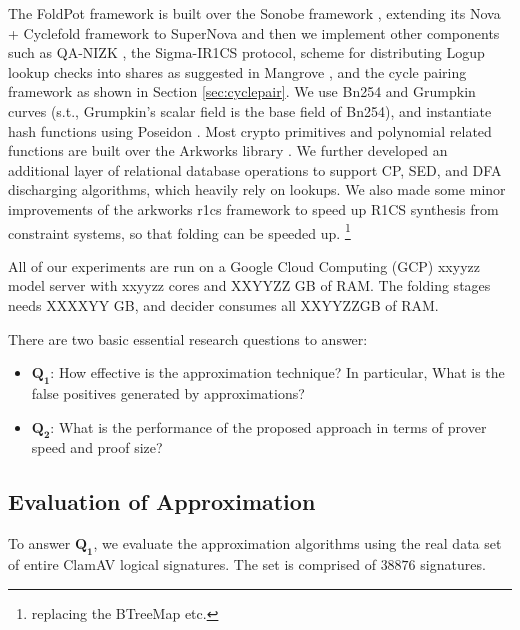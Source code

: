 The FoldPot framework is built over the
Sonobe framework \cite{Sonobe}, extending its Nova + Cyclefold framework
to SuperNova \cite{SuperNova} and then we implement other
components such as QA-NIZK \cite{Gonzalez15},
the Sigma-IR1CS protocol, scheme for distributing
Logup lookup \cite{Hab22} checks into shares as suggested
in Mangrove \cite{Mangrove}, and the 
cycle pairing framework as shown in Section \ref{sec:cyclepair}.
We use Bn254 and Grumpkin curves \cite{Grumpkin} 
(s.t., Grumpkin's scalar field is the base field of Bn254),
and instantiate hash functions using Poseidon \cite{Poseidon}.
Most crypto primitives and polynomial related functions
are built over the Arkworks library \cite{arkworks}.
We further developed an additional layer of
relational database operations to support
CP, SED, and DFA discharging algorithms,
which heavily rely on lookups.
We also made some minor improvements of the arkworks r1cs framework
to speed up R1CS synthesis from constraint systems, so that
folding can be speeded up. \footnote{replacing
the BTreeMap etc.}

 All of our experiments are run on
a Google Cloud Computing (GCP) xxyyzz model server with xxyyzz cores
and XXYYZZ GB of RAM. The folding stages needs XXXXYY GB, and
decider consumes all XXYYZZGB of RAM.

 There are two basic essential
research questions to answer: 
\begin{itemize}
	\item $\mathbf{Q_1}$: How effective is the approximation
	technique? In particular, What is the false positives generated
	by approximations? 

	\item $\mathbf{Q_2}$: What is the performance of the 
	proposed approach in terms of prover speed and proof size?
\end{itemize}

\subsection{Evaluation of Approximation}
To answer $\mathbf{Q_1}$, we evaluate the approximation algorithms
using the real data set of entire ClamAV logical signatures.
The set is comprised of $38876$ signatures.

